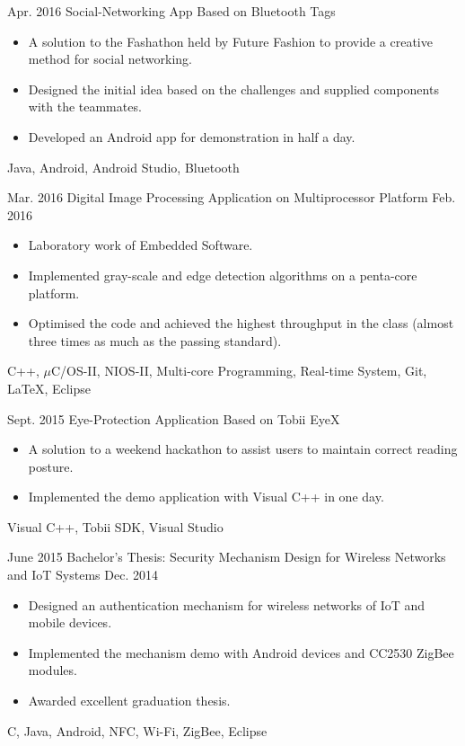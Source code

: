 \begin{projects}
  
  \project
    {Apr. 2016}     {Social-Networking App Based on Bluetooth Tags}
    {}    {
                      \begin{itemize}
                       \item A solution to the Fashathon held by Future Fashion to provide a creative method for social networking.
                       \item Designed the initial idea based on the challenges and supplied components with the teammates.
						\item Developed an Android app for demonstration in half a day.
                      \end{itemize}
                    }
                    {Java, Android, Android Studio, Bluetooth}
  \emptySeparator
  
  
  \project
  {Mar. 2016}       {Digital Image Processing Application on Multiprocessor Platform}
  {Feb. 2016}      {
                      \begin{itemize}
                       \item Laboratory work of Embedded Software.
						\item Implemented gray-scale and edge detection algorithms on a penta-core platform.
						\item Optimised the code and achieved the highest throughput in the class (almost three times as much as the passing standard).
                      \end{itemize}
                    }
                    {C++, $\mu$C/OS-II, NIOS-II, Multi-core Programming, Real-time System, Git, \LaTeX, Eclipse}
  \emptySeparator
  
  \project
  {Sept. 2015}		{Eye-Protection Application Based on Tobii EyeX}
  {}				{\begin{itemize}
  						\item A solution to a weekend hackathon to assist users to maintain correct reading posture.
						\item Implemented the demo application with Visual C++ in one day.
  					\end{itemize} 
                    }
                    {Visual C++, Tobii SDK, Visual Studio}
\emptySeparator


  \project
  {June 2015}		{Bachelor's Thesis: Security Mechanism Design for Wireless Networks and IoT Systems}
  {Dec. 2014}		{\begin{itemize}
  						\item Designed an authentication mechanism for wireless networks of IoT and mobile devices.
						\item Implemented the mechanism demo with Android devices and CC2530 ZigBee modules.
                        \item Awarded excellent graduation thesis.
  					\end{itemize} 
                    }
                    {C, Java, Android, NFC, Wi-Fi, ZigBee, Eclipse}
\emptySeparator



\end{projects}
